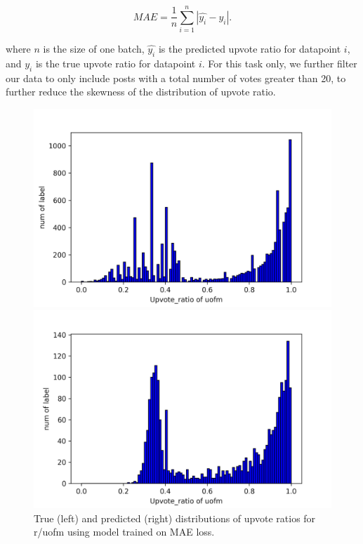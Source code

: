 \documentclass[11pt,a4paper]{article}
\begin{document}
    \[MAE = \frac{1}{n} \sum_{i=1}^n |\hat{y_i} - y_i|.\]

    where $n$ is the size of one batch, $\hat{y_i}$ is the predicted upvote ratio for datapoint $i$, and $y_i$ is the true upvote ratio for datapoint $i$. For this task only, we further filter our data to only include posts with a total number of votes greater than 20, to further reduce the skewness of the distribution of upvote ratio.

    \begin{figure}
        \begin{minipage}{0.5\textwidth}
            \includegraphics[width=\textwidth]{uofm_task2true_nonsmooth.png}
        \end{minipage}
        \begin{minipage}{0.5\textwidth}
            \includegraphics[width=\textwidth]{uofm_task2pred_nonsmooth.png}
        \end{minipage}

        \caption{True (left) and predicted (right) distributions of upvote ratios for r/uofm using model trained on MAE loss.}

        \label{fig:task2_before}
    \end{figure}
\end{document}
